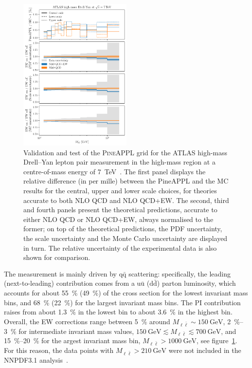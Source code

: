 \begin{figure}[!t]
    \centering
    \includegraphics[width=0.5\textwidth]{figures/pineappl_ATLASZHIGHMASS49FB}
    \caption{Validation and test of the \textsc{PineAPPL} grid for the ATLAS
      high-mass Drell--Yan lepton pair measurement in the high-mass region at
      a centre-of-mass energy of \SI{7}{\tera\electronvolt}~\cite{Aad:2013iua}. The first panel
      displays the relative difference (in per mille) between the {\sc PineAPPL}
      and the {\sc MC} results for the central, upper and lower scale choices,
      for theories accurate to both NLO QCD and NLO QCD+EW. The second, third
      and fourth panels present the theoretical predictions, accurate to either
      NLO QCD or NLO QCD+EW, always normalised to the former; on top of the
      theoretical predictions, the PDF uncertainty, the scale uncertainty and
      the Monte Carlo uncertainty are displayed in turn. The relative
      uncertainty of the experimental data is also shown for comparison.}
    \label{fig:atlaszhighmass49fb}
\end{figure}

The measurement is mainly driven by $\mathrm{q}\bar{\mathrm{q}}$ scattering: specifically, the
leading (next-to-leading) contribution comes from a $\mathrm{u}\bar{\mathrm{u}}$ ($\mathrm{d}\bar{\mathrm{d}}$)
parton luminosity, which accounts for about \SI{55}{\percent} (\SI{49}{\percent}) of the cross section
for the lowest invariant mass bins, and \SI{68}{\percent} (\SI{22}{\percent}) for the largest invariant
mass bins. The PI contribution raises from about \SI{1.3}{\percent} in the lowest bin to
about \SI{3.6}{\percent} in the highest bin. Overall, the EW corrections range between \SI{5}{\percent}
around $M_{\ell\bar\ell}\sim \SI{150}{\giga\electronvolt}$, \SIrange{2}{3}{\percent} for intermediate invariant mass
values, $\SI{150}{\giga\electronvolt}\lesssim M_{\ell\bar\ell}\lesssim \SI{700}{\giga\electronvolt}$, and
\SIrange{15}{20}{\percent} for the argest invariant mass bin, $M_{\ell\bar\ell}>\SI{1000}{\giga\electronvolt}$,
see figure~\ref{fig:atlaszhighmass49fb}. For this reason, the data points with
$M_{\ell\bar\ell}>\SI{210}{\giga\electronvolt}$ were not included in the NNPDF3.1
analysis~\cite{Ball:2017nwa}.

